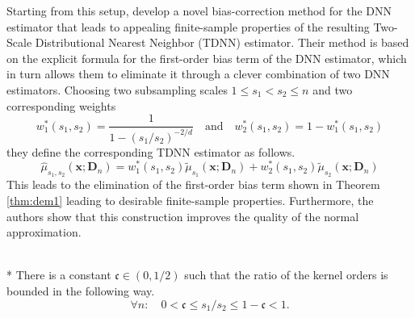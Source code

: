Starting from this setup, \citet{demirkaya_optimal_2024} develop a novel bias-correction method for the DNN estimator that leads to appealing finite-sample properties of the resulting Two-Scale Distributional Nearest Neighbor (TDNN) estimator.
Their method is based on the explicit formula for the first-order bias term of the DNN estimator, which in turn allows them to eliminate it through a clever combination of two DNN estimators.
Choosing two subsampling scales $1 \leq s_1 < s_2 \leq n$ and two corresponding weights
\begin{equation}
	w_1^{*}(s_1, s_2) = \frac{1}{1-(s_1/s_2)^{-2/d}}
	\quad\text{and}\quad
	w_2^{*}(s_1, s_2) = 1 - w_1^{*}(s_1, s_2)
\end{equation}
they define the corresponding TDNN estimator as follows.
\begin{equation}
	\hat{\mu}_{s_1, s_2}\left(\mathbf{x}; \mathbf{D}_n\right)
	= w_1^{*}(s_1, s_2)\tilde{\mu}_{s_1}\left(\mathbf{x}; \mathbf{D}_n\right) + w_2^{*}(s_1, s_2)\tilde{\mu}_{s_2}\left(\mathbf{x}; \mathbf{D}_n\right)
\end{equation}
This leads to the elimination of the first-order bias term shown in Theorem \ref{thm:dem1} leading to desirable finite-sample properties.
Furthermore, the authors show that this construction improves the quality of the normal approximation.

\begin{boxD}
	\begin{asm}\label{asm:kernel_order_ratio}\mbox{}\\*
		There is a constant $\mathfrak{c} \in (0,1/2)$ such that the ratio of the kernel orders is bounded in the following way.
		\begin{equation}
			\forall n: \quad 0 < \mathfrak{c} \leq s_1 / s_2 \leq 1 - \mathfrak{c} < 1.
		\end{equation}
	\end{asm}
\end{boxD}

